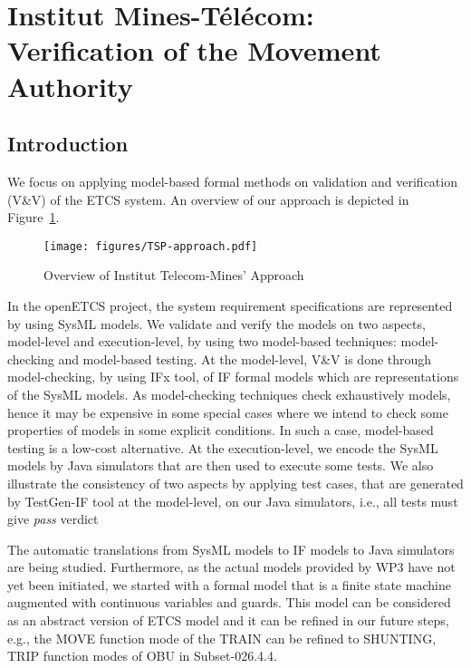\documentclass{template/openetcs_article}
\begin{document}
\newpage
\section{Institut Mines-Télécom: Verification of the Movement Authority}

\subsection{Introduction}

We focus on applying model-based formal methods on validation and verification
(V\&V) of the ETCS system.
An overview of our approach is depicted in Figure~\ref{fig:approach}.

\begin{figure}[!htbp]
\begin{center}
  \texttt{[image: figures/TSP-approach.pdf]}
  \caption{Overview of Institut Telecom-Mines' Approach}
  \label{fig:approach}
\end{center}
\end{figure}


In the openETCS project, the system requirement specifications are represented
by using SysML models. We validate and verify the models on two aspects,
model-level and execution-level, by using two model-based techniques:
model-checking and model-based testing.
At the model-level, V\&V is done through model-checking, by using IFx tool, of
IF formal models which are representations of the SysML models.
As model-checking techniques check exhaustively models, hence it may be
expensive in some special cases where we intend to check some properties of
models in some explicit conditions.
In such a case, model-based testing is a low-cost alternative.
At the execution-level, we encode the SysML models by Java simulators that are
then used to execute some tests.
We also illustrate the consistency of two aspects by applying test cases, that
are generated by TestGen-IF tool at the model-level, on our Java simulators,
i.e., all tests must give {\em pass} verdict

The automatic translations from SysML models to IF models to Java simulators are
being studied. Furthermore, as the actual models provided by WP3 have not yet
been initiated, we started with a formal model that is a finite state machine
augmented with continuous variables and guards. This model can be considered as
an abstract version of ETCS model and it can be refined in our future steps,
e.g., the MOVE function mode of the TRAIN can be refined to SHUNTING,
TRIP function modes of OBU in Subset-026.4.4.
\end{document}
